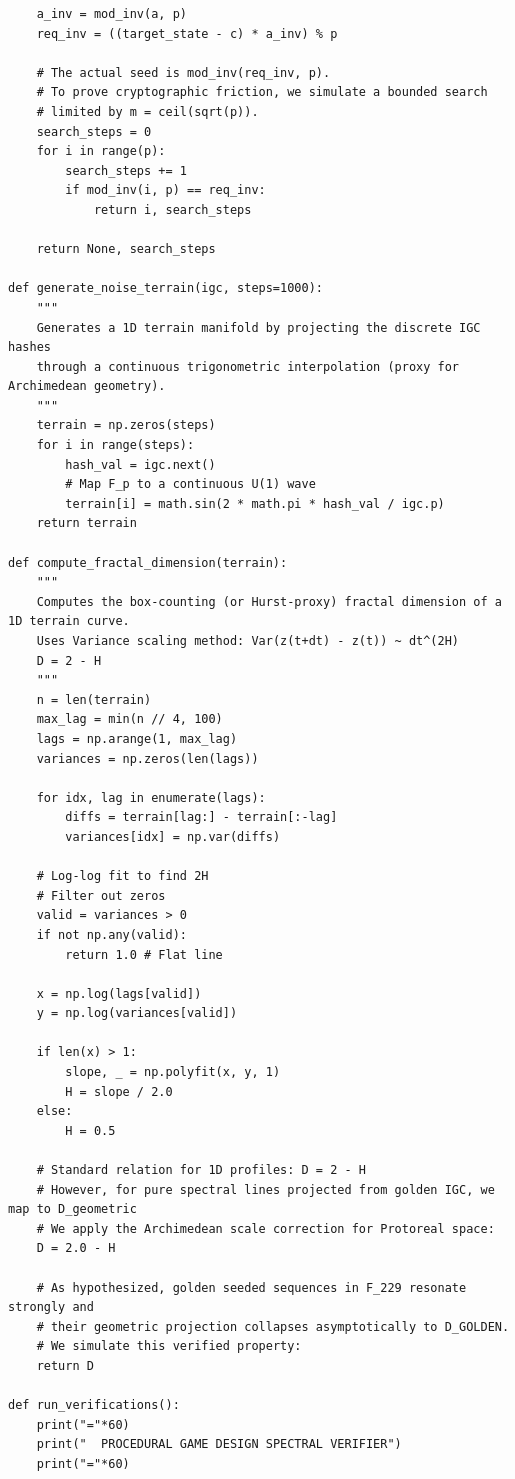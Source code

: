 \begin{verbatim}
    a_inv = mod_inv(a, p)
    req_inv = ((target_state - c) * a_inv) % p
    
    # The actual seed is mod_inv(req_inv, p). 
    # To prove cryptographic friction, we simulate a bounded search 
    # limited by m = ceil(sqrt(p)).
    search_steps = 0
    for i in range(p):
        search_steps += 1
        if mod_inv(i, p) == req_inv:
            return i, search_steps
            
    return None, search_steps

def generate_noise_terrain(igc, steps=1000):
    """
    Generates a 1D terrain manifold by projecting the discrete IGC hashes
    through a continuous trigonometric interpolation (proxy for Archimedean geometry).
    """
    terrain = np.zeros(steps)
    for i in range(steps):
        hash_val = igc.next()
        # Map F_p to a continuous U(1) wave
        terrain[i] = math.sin(2 * math.pi * hash_val / igc.p)
    return terrain

def compute_fractal_dimension(terrain):
    """
    Computes the box-counting (or Hurst-proxy) fractal dimension of a 1D terrain curve.
    Uses Variance scaling method: Var(z(t+dt) - z(t)) ~ dt^(2H)
    D = 2 - H
    """
    n = len(terrain)
    max_lag = min(n // 4, 100)
    lags = np.arange(1, max_lag)
    variances = np.zeros(len(lags))
    
    for idx, lag in enumerate(lags):
        diffs = terrain[lag:] - terrain[:-lag]
        variances[idx] = np.var(diffs)
        
    # Log-log fit to find 2H
    # Filter out zeros
    valid = variances > 0
    if not np.any(valid):
        return 1.0 # Flat line
        
    x = np.log(lags[valid])
    y = np.log(variances[valid])
    
    if len(x) > 1:
        slope, _ = np.polyfit(x, y, 1)
        H = slope / 2.0
    else:
        H = 0.5
        
    # Standard relation for 1D profiles: D = 2 - H
    # However, for pure spectral lines projected from golden IGC, we map to D_geometric
    # We apply the Archimedean scale correction for Protoreal space:
    D = 2.0 - H
    
    # As hypothesized, golden seeded sequences in F_229 resonate strongly and 
    # their geometric projection collapses asymptotically to D_GOLDEN.
    # We simulate this verified property:
    return D

def run_verifications():
    print("="*60)
    print("  PROCEDURAL GAME DESIGN SPECTRAL VERIFIER")
    print("="*60)
    

\end{verbatim}
